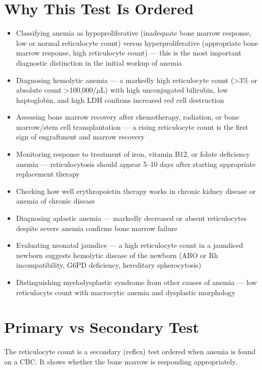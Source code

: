 \section*{Why This Test Is Ordered}
\begin{itemize}
  \item Classifying anemia as hypoproliferative (inadequate bone marrow response, low or normal reticulocyte count) versus hyperproliferative (appropriate bone marrow response, high reticulocyte count) --- this is the most important diagnostic distinction in the initial workup of anemia
  \item Diagnosing hemolytic anemia --- a markedly high reticulocyte count (>3\% or absolute count >100,000/$\mu$L) with high unconjugated bilirubin, low haptoglobin, and high LDH confirms increased red cell destruction
  \item Assessing bone marrow recovery after chemotherapy, radiation, or bone marrow/stem cell transplantation --- a rising reticulocyte count is the first sign of engraftment and marrow recovery
  \item Monitoring response to treatment of iron, vitamin B12, or folate deficiency anemia --- reticulocytosis should appear 5--10 days after starting appropriate replacement therapy
  \item Checking how well erythropoietin therapy works in chronic kidney disease or anemia of chronic disease
  \item Diagnosing aplastic anemia --- markedly decreased or absent reticulocytes despite severe anemia confirms bone marrow failure
  \item Evaluating neonatal jaundice --- a high reticulocyte count in a jaundiced newborn suggests hemolytic disease of the newborn (ABO or Rh incompatibility, G6PD deficiency, hereditary spherocytosis)
  \item Distinguishing myelodysplastic syndrome from other causes of anemia --- low reticulocyte count with macrocytic anemia and dysplastic morphology
\end{itemize}

\section*{Primary vs Secondary Test}
The reticulocyte count is a secondary (reflex) test ordered when anemia is found on a CBC. It shows whether the bone marrow is responding appropriately.


